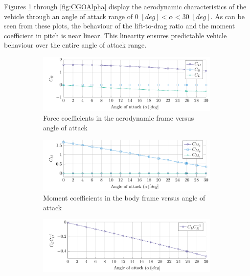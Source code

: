  Figures \ref{fig:CLCDCSAlpha} through \ref{fig:CGOAlpha} display the aerodynamic characteristics of the vehicle through an angle of attack range of $0$ $\left[deg\right]<\alpha<30$ $\left[deg\right]$. As can be seen from these plots, the behaviour of the lift-to-drag ratio and the moment coefficient in pitch is near linear. This linearity ensures predictable vehicle behaviour over the entire angle of attack range.
 
 \begin{figure}[h]
 	\centering
 	
 	\begin{subfigure}[b]{0.49\textwidth}
 		\includegraphics[width=0.99\textwidth]{./Figure/Aerodynamics/CDCSCLAlpha.pdf}
 		\caption{Force coefficients in the aerodynamic frame versus angle of attack}
 		\label{fig:CLCDCSAlpha}
 	\end{subfigure}
 	\begin{subfigure}[b]{0.49\textwidth}
 		\includegraphics[width=0.99\textwidth]{./Figure/Aerodynamics/CMXCMYCMZAlpha.pdf}
 		\caption{Moment coefficients in the body frame versus angle of attack}
 		\label{fig:CMxCMyCMzAlpha}
 	\end{subfigure}
 	\begin{subfigure}[b]{0.49\textwidth}
 		\includegraphics[width=0.99\textwidth]{./Figure/Aerodynamics/CLCDAlpha.pdf}

\end{subfigure}
\end{figure}
